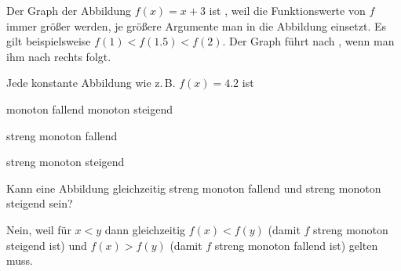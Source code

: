 \documentclass[]{uebungsblatt}
\begin{document}
\begin{exercise}
    Der Graph der Abbildung $f(x)=x+3$ ist  , weil die Funktionswerte von $f$ immer größer werden, je größere Argumente man in die Abbildung einsetzt. Es gilt beispielsweise $f(1)<f(1.5)<f(2)$. Der Graph führt  nach \mbox{,} wenn man ihm nach rechts folgt.
\end{exercise}
\begin{exercise}
    Jede konstante Abbildung wie z.\,B. $f(x)=4.2$ ist
    \begin{multiplechoice}
        \begin{multicols}{2}
            \citem monoton fallend
            \citem monoton steigend
            \item streng monoton fallend
            \item streng monoton steigend
        \end{multicols}
    \end{multiplechoice}
\end{exercise}
\begin{exercise}
    Kann eine Abbildung gleichzeitig streng monoton fallend und streng monoton steigend sein?
    \begin{answerbox}[.5in]
        Nein, weil für $x<y$ dann gleichzeitig $f(x)<f(y)$ (damit $f$ streng monoton steigend ist) und $f(x)>f(y)$ (damit $f$ streng monoton fallend ist) gelten muss.
    \end{answerbox}
\end{exercise}

\end{document}
